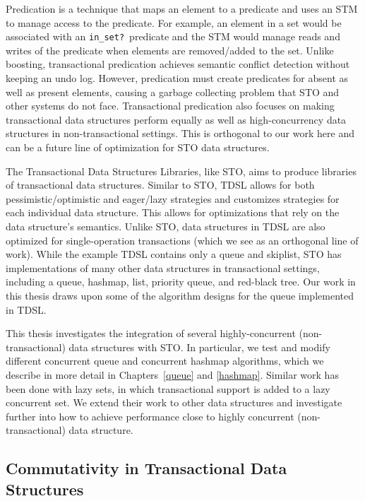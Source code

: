 Predication\cite{predication} is a technique that maps an element to a predicate and uses an STM to manage access to the predicate. For example, an element in a set would be associated with an \texttt{in\_set?}\ predicate and the STM would manage reads and writes of the predicate when elements are removed/added to the set. Unlike boosting, transactional predication achieves semantic conflict detection without keeping an undo log. However, predication must create predicates for absent as well as present elements, causing a garbage collecting problem that STO and other systems do not face. Transactional predication also focuses on making transactional data structures perform equally as well as high-concurrency data structures in non-transactional settings. This is orthogonal to our work here and can be a future line of optimization for STO data structures.

The Transactional Data Structures Libraries\cite{tdsl}, like STO, aims to produce libraries of transactional data structures. Similar to STO, TDSL allows for both pessimistic/optimistic and eager/lazy strategies and customizes strategies for each individual data structure. This allows for optimizations that rely on the data structure's semantics. Unlike STO, data structures in TDSL are also optimized for single-operation transactions (which we see as an orthogonal line of work). While the example TDSL contains only a queue and skiplist, STO has implementations of many other data structures in transactional settings, including a queue, hashmap, list, priority queue, and red-black tree. Our work in this thesis draws upon some of the algorithm designs for the queue implemented in TDSL.

This thesis investigates the integration of several highly-concurrent (non-transactional) data structures with STO. In particular, we test and modify different concurrent queue \cite{queue1}\cite{queue2}\cite{queue3}\cite{queue4}\cite{queue5}\cite{flatcombining} and concurrent hashmap\cite{hm1}\cite{hm2}\cite{hm3}\cite{chm} algorithms, which we describe in more detail in Chapters~\ref{queue} and \ref{hashmap}. Similar work has been done with lazy sets\cite{lazyset}, in which transactional support is added to a lazy concurrent set. We extend their work to other data structures and investigate further into how to achieve performance close to highly concurrent (non-transactional) data structure.

\subsection{Commutativity in Transactional Data Structures}


